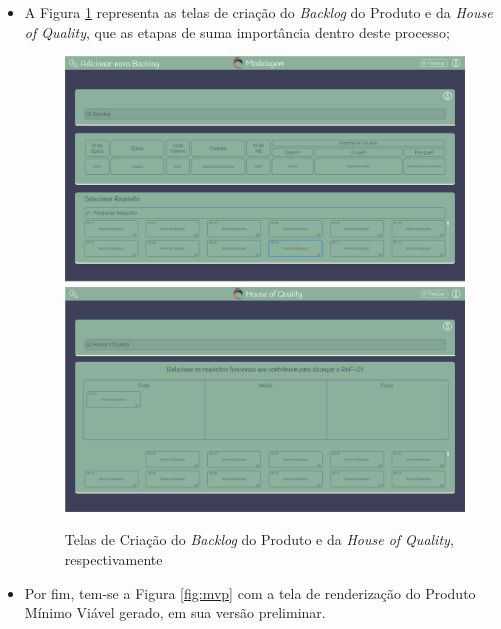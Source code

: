 \begin{itemize}
\begin{figure}[H]
\begin{center}
    \end{center}
    \end{figure}
    \item A Figura \ref{fig:backlog_prototipo} representa as telas de criação do \textit{Backlog} do Produto e da \textit{House of Quality}, que as etapas de suma importância dentro deste processo;
    \begin{figure}[]
      \begin{center}
          \caption{{Telas de Criação do \textit{Backlog} do Produto e da \textit{House of Quality}, respectivamente}}
          \label{fig:backlog_prototipo}
          \includegraphics[scale=0.3]{figuras/Prototipo/backlog.png}
          \includegraphics[scale=0.3]{figuras/Prototipo/house-of-quality.png}
    \end{center}
    \end{figure}
    \item Por fim, tem-se a Figura \ref{fig:mvp} com a tela de renderização do Produto Mínimo Viável gerado, em sua versão preliminar.
    \begin{figure}[H]

\end{figure}
\end{itemize}
